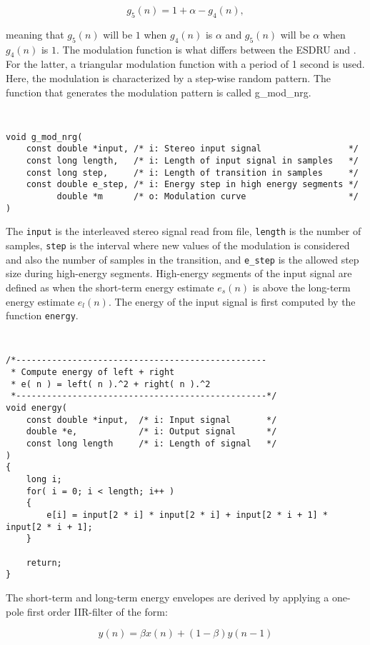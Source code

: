   \[
    g_5(n) = 1 + \alpha - g_4(n),
  \]
  
meaning that $g_5(n)$ will be $1$ when $g_4(n)$ is $\alpha$ and $g_5(n)$ will be $\alpha$
 when $g_4(n)$ is $1$. The modulation function is what differs between the ESDRU and
\cite{SDRU}. For the latter, a triangular modulation function with a period of 1 second
is used. Here, the modulation is characterized by a step-wise random pattern. The function
that generates the modulation pattern is called g\_mod\_nrg.

{\tt\small
\begin{verbatim}
void g_mod_nrg(
    const double *input, /* i: Stereo input signal                 */
    const long length,   /* i: Length of input signal in samples   */
    const long step,     /* i: Length of transition in samples     */
    const double e_step, /* i: Energy step in high energy segments */
          double *m      /* o: Modulation curve                    */
)
\end{verbatim}
}

The \texttt{input} is the interleaved stereo signal read from file, \texttt{length} is the number
of samples, \texttt{step} is the interval where new values of the modulation is considered and also
the number of samples in the transition, and \texttt{e\_step} is the allowed step size during high-energy
segments. High-energy segments of the input signal are defined as when the short-term energy estimate 
$e_s(n)$ is above the long-term energy estimate $e_l(n)$. The energy of the input signal is first computed
by the function \texttt{energy}.

{\tt\small
\begin{verbatim}
/*-------------------------------------------------
 * Compute energy of left + right
 * e( n ) = left( n ).^2 + right( n ).^2
 *-------------------------------------------------*/
void energy(
    const double *input,  /* i: Input signal       */
    double *e,            /* i: Output signal      */
    const long length     /* i: Length of signal   */
)
{
    long i;
    for( i = 0; i < length; i++ )
    {
        e[i] = input[2 * i] * input[2 * i] + input[2 * i + 1] * input[2 * i + 1];
    }

    return;
} 
\end{verbatim}
}

The short-term and long-term energy envelopes are derived by applying a one-pole first order IIR-filter
of the form:

  \[
    y(n) = \beta x(n) + (1 - \beta) y(n-1)
  \]

